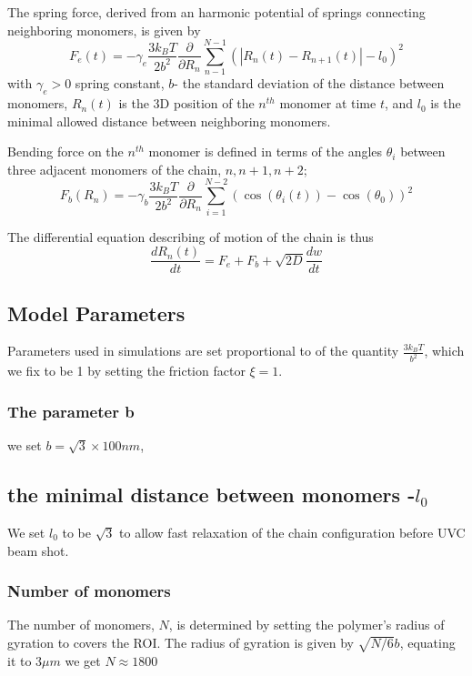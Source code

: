 \documentclass[12pt]{report}
\begin{document}
     The spring force, derived from an harmonic potential of springs connecting neighboring monomers, is given by
     \begin{equation*}
      F_e(t) = -\gamma_e\frac{3k_BT}{2b^2}\frac{\partial}{\partial R_n}\sum_{n-1}^{N-1}(|R_n(t)-R_{n+1}(t)| -l_0)^2
     \end{equation*}
     with $\gamma_e>0$ spring constant, $b$- the standard deviation of the distance between monomers, $R_n(t)$ is the 3D position of the $n^{th}$ monomer at time $t$, and $l_0$ is the minimal allowed distance between neighboring monomers.
     
     Bending force on the $n^{th}$ monomer is defined in terms of the angles $\theta_i$ between three adjacent monomers of the chain, $n,n+1,n+2$;
     \begin{equation*}
     F_b(R_n) = -\gamma_b\frac{3k_BT}{2b^2}\frac{\partial}{\partial R_n}\sum_{i=1}^{N-2}(\cos(\theta_i(t))-\cos(\theta_0))^2
     \end{equation*}
               
     The differential equation describing of motion of the chain is thus 
     \begin{equation*}
     \frac{dR_n(t)}{dt}= F_e +F_b +\sqrt{2D} \frac{dw}{dt}     
     \end{equation*}
     
    \subsection{Model Parameters}
      Parameters used in simulations are set proportional to of the quantity $\frac{3k_BT}{b^2}$, which we fix to be 1 by setting the friction factor $\xi=1$. 
    \subsubsection{The parameter b} 
      we set $b=\sqrt{3} \times 100 nm$, 
    \subsection{the minimal distance between monomers -$l_0$}
     We set $l_0$ to be $\sqrt{3}$ to allow fast relaxation of the chain configuration before UVC beam shot. 
    \subsubsection{Number of monomers}
      The number of monomers, $N$, is determined by setting the polymer's radius of gyration to covers the ROI. The radius of gyration is given by $\sqrt{N/6}b$, equating it to $3\mu m$ we get $N\approx 1800$                      
\end{document}
